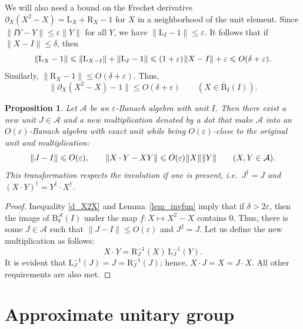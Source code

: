 \documentclass[12pt]{article}
\newcommand{\calA}{\mathcal{A}}
\newcommand{\ts}{\mkern1mu}
\newcommand{\Ba}{\mathrm{B}}
\newcommand{\La}{\mathrm{L}}
\newcommand{\Ra}{\mathrm{R}}
\newcommand{\eps}{\varepsilon}
\renewcommand{\le}{\leqslant}
\newtheorem{Proposition}[Theorem]{Proposition}
\newtheorem[definition]{Definition}[Theorem]{Definition}
\newtheorem[remark]{Example}[Theorem]{Example}
\newtheorem[remark]{Remark}[Theorem]{Remark}
\newtheorem[remark]{Question}[Theorem]{Open question}
\newtheorem*[definition]{definition}{Definition}
\newtheorem*[remark]{example}{Example}
\newtheorem*[remark]{remark}{Remark}
\newtheorem*[remark]{question}{Open question}
\numberwithin{equation}{section}
\begin{document}
We will also need a bound on the Frechet derivative $\partial_X(X^2-X)=\La_X+\Ra_X-1$ for $X$ in a neighborhood of the unit element. Since $\|IY-Y\|\le\eps\|Y\|$ for all $Y$, we have $\|\La_I-1\|\le \eps$. It follows that if $\|X-I\|\le\delta$, then
\[
\|\La_X-1\| \le \|\La_{X-I}\|+\|\La_I-1\|\le (1+\eps)\ts\|X-I\|+\eps\le O(\delta+\eps).
\]
Similarly, $\|\Ra_X-1\|\le O(\delta+\eps)$. Thus,
\begin{equation}\label{d_X2X}
\|\partial_X(X^2-X)-1\|\le O(\delta+\eps)\qquad (X\in\bar{\Ba}_{\delta}(I)).
\end{equation}

\begin{Proposition}\label{prop_unit}
Let $\calA$ be an $\eps$-Banach algebra with unit $I$. Then there exist a new unit $J\in\calA$ and a new multiplication denoted by a dot that make $\calA$ into an $O(\eps)$-Banach algebra with exact unit while being $O(\eps)$-close to the original unit and multiplication:
\begin{equation}
\|J-I\|\le O(\eps),\qquad \|X\cdot Y-XY\|\le O(\eps)\ts\|X\|\ts\|Y\|\qquad
(X,Y\in\calA).
\end{equation} 
This transformation respects the involution if one is present, i.e.\ $J^\dag=J$ and $(X\cdot Y)^\dag=Y^\dag\cdot X^\dag$.
\end{Proposition}

\begin{proof}
Inequality \eqref{d_X2X} and Lemma~\ref{lem_invfun} imply that if $\delta>2\eps$, then the image of $\Ba^\calA_{\delta}(I)$ under the map $f\colon X\mapsto X^2-X$ contains $0$. Thus, there is some $J\in\calA$ such that $\|J-I\|\le O(\eps)$ and $J^2=J$. Let us define the new multiplication as follows:
\begin{equation}
X\cdot Y= \Ra_{J}^{-1}(X)\,\La_{J}^{-1}(Y).
\end{equation}
It is evident that $\La_{J}^{-1}(J) =J =\Ra_{J}^{-1}(J)$; hence, $X\cdot J=X=J\cdot X$. All other requirements are also met.
\end{proof}


\section{Approximate unitary group}\label{sec_unitaries}
\end{document}
